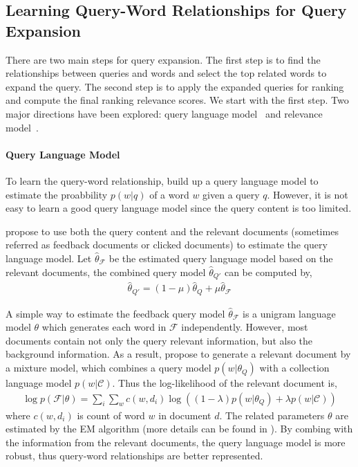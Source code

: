 \subsection{Learning Query-Word Relationships for Query Expansion}

There are two main steps for query expansion. The first step is to find the relationships between queries and words and select the top related words to expand the query. The second step is to apply the expanded queries for ranking and compute the final ranking relevance scores. We start with the first step. Two major directions have been explored: query language model~\citep{zhai-01b} and relevance model~\citep{Lavrenko-2001}.

\paragraph{Query Language Model}

To learn the query-word relationship, \cite{zhai-01b} build up a query language model to estimate the proabbility $p(w|q)$ of a word $w$ given a query $q$. However, it is not easy to learn a good query language model since the query content is too limited.

\cite{zhai-01b} propose to use both the query content and the relevant documents (sometimes referred as feedback documents or clicked documents) to estimate the query language model. Let $\hat{\theta}_{\mathcal{F}}$ be the estimated query language model based on the relevant documents, the combined query model $\hat{\theta}_{Q'}$ can be computed by,
\begin{align}
\label{eq:qlm-comb}
\hat{\theta}_{Q'} = (1 - \mu)\hat{\theta}_{Q} + \mu \hat{\theta}_{\mathcal{F}}
\end{align}

A simple way to estimate the feedback query model $\hat{\theta}_{\mathcal{F}}$ is a unigram language model $\theta$ which generates each word in $\mathcal{F}$ independently. However, most documents contain not only the query relevant information, but also the background information. As a result, \cite{zhai-01b} propose to generate a relevant document by a mixture model, which combines a query model $p(w|\theta_Q)$ with a collection language model $p(w|\mathcal{C})$. Thus the log-likelihood of the relevant document is,
\begin{align}
\log p(\mathcal{F}|\theta) = \sum_i \sum_w c(w, d_i) \log((1-\lambda)p(w|\theta_Q) + \lambda p(w|\mathcal{C}))
\end{align}
where $c(w, d_i)$ is count of word $w$ in document $d$. The related parameters $\theta$ are estimated by the EM algorithm (more details can be found in \cite{zhai-01b}). By combing with the information from the relevant documents, the query language model is more robust, thus query-word relationships are better represented.

